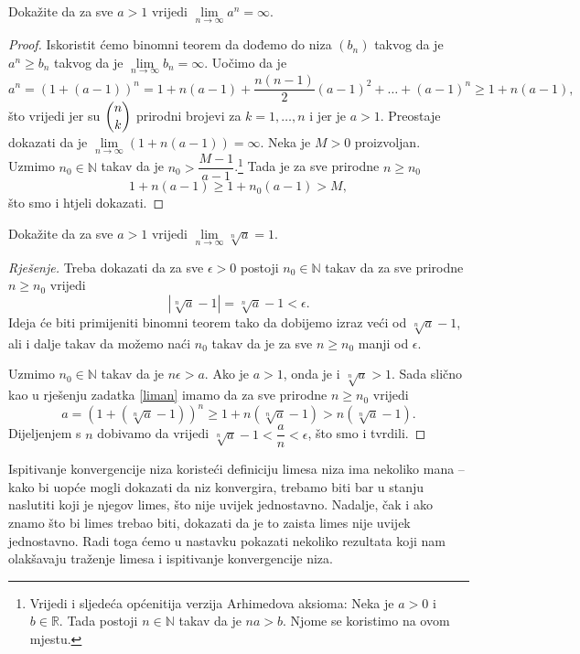 \begin{exercise}
\label{liman}
Dokažite da za sve $a>1$ vrijedi $\lim\limits_{n\to \infty}{a^n}=\infty$.
\end{exercise}
\begin{proof}
Iskoristit ćemo binomni teorem da dođemo do niza $(b_n)$ takvog da je $a^n\geq b_n$ takvog da je $\lim\limits_{n\to \infty}{b_n}=\infty$. Uočimo da je
$$a^n=(1+(a-1))^n=1+n(a-1)+\dfrac{n(n-1)}{2}(a-1)^2+\dots+(a-1)^n\geq 1+n(a-1),$$
što vrijedi jer su $\dbinom{n}{k}$ prirodni brojevi za $k=1,\dots, n$ i jer je $a>1$. Preostaje dokazati da je $\lim\limits_{n\to \infty}\left(1+n\left(a-1\right)\right)=\infty$. Neka je $M>0$ proizvoljan. Uzmimo $n_0\in \mathbb{N}$ takav da je $n_0>\dfrac{M-1}{a-1}$.\footnote{Vrijedi i sljedeća općenitija verzija Arhimedova aksioma: Neka je $a>0$ i $b\in \mathbb{R}$. Tada postoji $n\in \mathbb{N}$ takav da je $na>b$. Njome se koristimo na ovom mjestu.} Tada je za sve prirodne $n\geq n_0$
$$1+n(a-1)\geq 1+n_0(a-1)>M,$$
što smo i htjeli dokazati.
\end{proof}
\begin{exercise}
Dokažite da za sve $a>1$ vrijedi $\lim\limits_{n\to \infty}{\sqrt[n]{a}}=1$.
\end{exercise}
\begin{proof}[Rješenje]
Treba dokazati da za sve $\epsilon>0$ postoji $n_0\in \mathbb{N}$ takav da za sve prirodne $n\geq n_0$ vrijedi
$$|\sqrt[n]{a}-1|=\sqrt[n]{a}-1<\epsilon.$$
Ideja će biti primijeniti binomni teorem tako da dobijemo izraz veći od $\sqrt[n]{a}-1$, ali i dalje takav da možemo naći $n_0$ takav da je za sve $n\geq n_0$ manji od $\epsilon$.

Uzmimo $n_0\in \mathbb{N}$ takav da je $n\epsilon>a$. Ako je $a>1$, onda je i $\sqrt[n]{a}>1$. Sada slično kao u rješenju zadatka \ref{liman} imamo da za sve prirodne $n\geq n_0$ vrijedi
$$a=\left(1+(\sqrt[n]{a}-1)\right)^n\geq 1+n(\sqrt[n]{a}-1)>n(\sqrt[n]{a}-1).$$
Dijeljenjem s $n$ dobivamo da vrijedi $\sqrt[n]{a}-1<\dfrac{a}{n}<\epsilon$, što smo i tvrdili.
\end{proof}

Ispitivanje konvergencije niza koristeći definiciju limesa niza ima nekoliko mana -- kako bi uopće mogli dokazati da niz konvergira, trebamo biti bar u stanju naslutiti koji je njegov limes, što nije uvijek jednostavno. Nadalje, čak i ako znamo što bi limes trebao biti, dokazati da je to zaista limes nije uvijek jednostavno. Radi toga ćemo u nastavku pokazati nekoliko rezultata koji nam olakšavaju traženje limesa i ispitivanje konvergencije niza.

